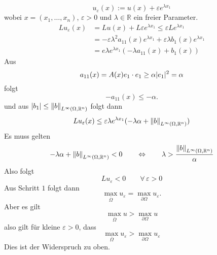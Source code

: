 \begin{beweis}
\begin{description}
		\[
			u_{\varepsilon}(x):= u(x) + \varepsilon e^{\lambda x_1}
		\]
		wobei $x = (x_1, \dots, x_n)$, $\varepsilon > 0$ und $\lambda \in \mathbb{R}$ ein freier Parameter.
		\begin{align*}
			Lu_{\varepsilon}(x) &= Lu(x) + L \varepsilon e^{\lambda x_1} \leq \varepsilon L e^{\lambda x_1} \\ 
			&= - \varepsilon \lambda^2 a_{11}(x) e^{\lambda x_1} + \varepsilon \lambda b_1(x) e^{\lambda x_1} \\
			&= e \lambda e^{\lambda x_1} ( - \lambda a_{11}(x)+ b_1(x))
		\end{align*}
		Aus \begin{equation}
			a_{11}(x)= A(x)e_1 \cdot e_1 \geq \alpha \lvert e_1\rvert^2 = \alpha
		\end{equation}
		folgt
		\[
			-a_{11}(x) \leq -\alpha.
		\]
		und aus $\abs{b_1} \leq \norm{b}_{L^{\infty}(\Omega,\mathbb{R}^n)}$ folgt dann
		\[
			Lu_{\varepsilon}(x) \leq  \varepsilon \lambda e^{\lambda x_1}(-\lambda \alpha + \norm{b}_{L^{\infty}(\Omega,\mathbb{R}^n)})
		\]
		Es muss gelten 
		\[
			-\lambda \alpha + \norm{b}_{L^{\infty}(\Omega,\mathbb{R}^n)}<0 \qquad \Leftrightarrow \qquad \lambda > \frac{\norm{b}_{L^{\infty}(\Omega,\mathbb{R}^n)}}{\alpha}
		\]
		Also folgt 
		\[
			Lu_{\varepsilon} < 0 \qquad \forall\, \varepsilon >0 
		\]
		Aus Schritt $1$ folgt dann
		\[
			\max_{\bar{\Omega}}u_{\varepsilon} = \max_{ \partial \Omega}u_{\varepsilon}.
		\]
		Aber es gilt \[
			\max_{\bar{\Omega}}u > \max_{ \partial \Omega}u
		\]
		also gilt für kleine $\varepsilon >0$, dass \[
			\max_{\bar{\Omega}}u_{\varepsilon} > \max_{ \partial \Omega}u_{\varepsilon}
		\]
		Dies ist der Widerspruch zu oben.
 	\end{description}
\end{beweis}
